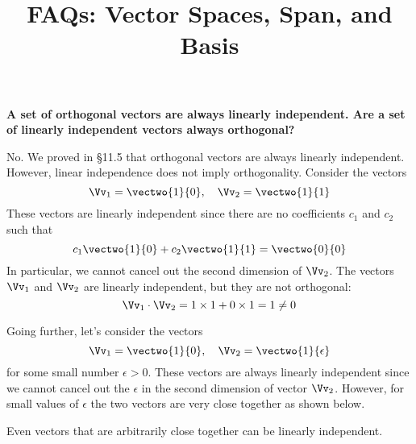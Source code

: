 \documentclass[12pt]{article}
\title{FAQs: Vector Spaces, Span, and Basis}
\date{}
\begin{document}
\maketitle

\textbf{A set of orthogonal vectors are always linearly independent. Are a set of linearly independent vectors always orthogonal?}

No. We proved in \S 11.5 that orthogonal vectors are always linearly independent. However, linear independence does not imply orthogonality. Consider the vectors
\[ \Vv_1 = \vectwo{1}{0}, \quad \Vv_2 = \vectwo{1}{1} \]
These vectors are linearly independent since there are no coefficients $c_1$ and $c_2$ such that
\[ c_1\vectwo{1}{0} + c_2\vectwo{1}{1} = \vectwo{0}{0} \]
In particular, we cannot cancel out the second dimension of $\Vv_2$. The vectors $\Vv_1$ and $\Vv_2$ are linearly independent, but they are not orthogonal:
\[ \Vv_1\cdot\Vv_2 = 1\times1 + 0\times1 = 1 \ne 0 \]

Going further, let's consider the vectors
\[ \Vv_1 = \vectwo{1}{0},\quad \Vv_2=\vectwo{1}{\epsilon} \]
for some small number $\epsilon>0$. These vectors are always linearly independent since we cannot cancel out the $\epsilon$ in the second dimension of vector $\Vv_2$. However, for small values of $\epsilon$ the two vectors are very close together as shown below.

\begin{center}
\end{center}

Even vectors that are arbitrarily close together can be linearly independent.
	
\end{document}
